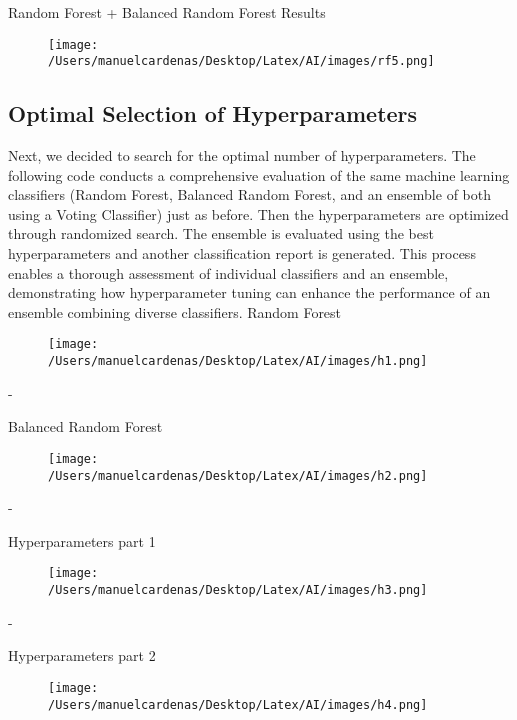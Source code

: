 \documentclass{article}
\begin{document}
    Random Forest + Balanced Random Forest Results
    \begin{figure}[h]
        \centering
        \texttt{[image: /Users/manuelcardenas/Desktop/Latex/AI/images/rf5.png]}
        \label{fig:rf5}
    \end{figure}

    \subsection{Optimal Selection of Hyperparameters}

    Next, we decided to search for the optimal number of hyperparameters. The following code conducts a comprehensive 
    evaluation of the same machine learning classifiers (Random Forest, Balanced Random Forest, and an ensemble of both using 
    a Voting Classifier) just as before. Then the hyperparameters are optimized through randomized search. The ensemble is evaluated 
    using the best hyperparameters and another classification report is generated. This process enables a thorough assessment 
    of individual classifiers and an ensemble, demonstrating how hyperparameter tuning can enhance the performance of an ensemble 
    combining diverse classifiers.\pagebreak
    Random Forest
    \begin{figure}[h]
        \centering
        \texttt{[image: /Users/manuelcardenas/Desktop/Latex/AI/images/h1.png]}
        \label{fig:h1}
    \end{figure}
    - \pagebreak

    Balanced Random Forest
    \begin{figure}[h]
        \centering
        \texttt{[image: /Users/manuelcardenas/Desktop/Latex/AI/images/h2.png]}
        \label{fig:h2}
    \end{figure}
    - \pagebreak

    Hyperparameters part 1
    \begin{figure}[h]
        \centering
        \texttt{[image: /Users/manuelcardenas/Desktop/Latex/AI/images/h3.png]}
        \label{fig:h3}
    \end{figure}
    - \pagebreak

    Hyperparameters part 2
    \begin{figure}[h]
        \centering
        \texttt{[image: /Users/manuelcardenas/Desktop/Latex/AI/images/h4.png]}
        \label{fig:h4}
    \end{figure}
    
\end{document}
